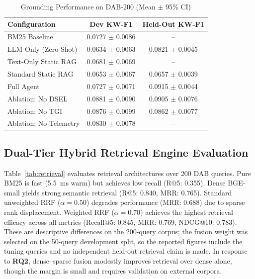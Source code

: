 \documentclass[conference]{IEEEtran}
\begin{document}
\begin{table}[h]
\caption{Grounding Performance on DAB-200 (Mean $\pm$ 95\% CI)}
\label{tab:main}
\centering
\footnotesize
\setlength{\tabcolsep}{4pt}
\begin{tabular*}{\columnwidth}{@{\extracolsep{\fill}}lcc@{}}
\toprule
Configuration & Dev KW-F1 & Held-Out KW-F1 \\
\midrule
BM25 Baseline & 0.0727 $\pm$ 0.0086 & -- \\
LLM-Only (Zero-Shot) & 0.0634 $\pm$ 0.0063 & 0.0821 $\pm$ 0.0045 \\
Text-Only Static RAG & 0.0681 $\pm$ 0.0069 & -- \\
Standard Static RAG & 0.0653 $\pm$ 0.0067 & 0.0657 $\pm$ 0.0039 \\
Full Agent & 0.0727 $\pm$ 0.0071 & 0.0915 $\pm$ 0.0044 \\
\midrule
Ablation: No DSEL & 0.0881 $\pm$ 0.0090 & 0.0905 $\pm$ 0.0076 \\
Ablation: No TGI & 0.0876 $\pm$ 0.0099 & 0.0862 $\pm$ 0.0077 \\
Ablation: No Telemetry & 0.0830 $\pm$ 0.0078 & -- \\
\bottomrule
\end{tabular*}
\end{table}

\subsection{Dual-Tier Hybrid Retrieval Engine Evaluation}
Table~\ref{tab:retrieval} evaluates retrieval architectures over 200 DAB queries. Pure BM25 is fast (5.5~ms warm) but achieves low recall (R@5: 0.355). Dense BGE-small yields strong semantic retrieval (R@5: 0.840, MRR: 0.765). Standard unweighted RRF ($\alpha = 0.50$) degrades performance (MRR: 0.688) due to sparse rank displacement. Weighted RRF ($\alpha = 0.70$) achieves the highest retrieval efficacy across all metrics (Recall@5: 0.845, MRR: 0.769, NDCG@10: 0.783). These are descriptive differences on the 200-query corpus; the fusion weight was selected on the 50-query development split, so the reported figures include the tuning queries and no independent held-out retrieval claim is made. In response to \textbf{RQ2}, dense--sparse fusion modestly improves retrieval over dense alone, though the margin is small and requires validation on external corpora.
\end{document}
